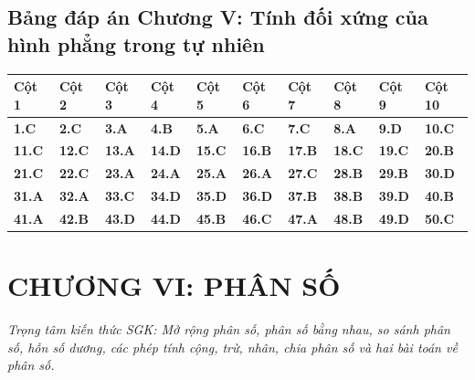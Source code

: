 \documentclass[11pt,a4paper]{article}
\begin{document}
\subsection*{\color{primary} Bảng đáp án Chương V: Tính đối xứng của hình phẳng trong tự nhiên}
\begin{center}
\renewcommand{\arraystretch}{1.25}
\begin{tabularx}{\textwidth}{*{10}{>{\centering\arraybackslash}X}}
\toprule
\textbf{\color{primary} Cột 1} & \textbf{\color{primary} Cột 2} & \textbf{\color{primary} Cột 3} & \textbf{\color{primary} Cột 4} & \textbf{\color{primary} Cột 5} & \textbf{\color{primary} Cột 6} & \textbf{\color{primary} Cột 7} & \textbf{\color{primary} Cột 8} & \textbf{\color{primary} Cột 9} & \textbf{\color{primary} Cột 10} \\
\midrule
\textbf{1.C} & \textbf{2.C} & \textbf{3.A} & \textbf{4.B} & \textbf{5.A} & \textbf{6.C} & \textbf{7.C} & \textbf{8.A} & \textbf{9.D} & \textbf{10.C} \\
\rowcolor{rowtint} \textbf{11.C} & \textbf{12.C} & \textbf{13.A} & \textbf{14.D} & \textbf{15.C} & \textbf{16.B} & \textbf{17.B} & \textbf{18.C} & \textbf{19.C} & \textbf{20.B} \\
\textbf{21.C} & \textbf{22.C} & \textbf{23.A} & \textbf{24.A} & \textbf{25.A} & \textbf{26.A} & \textbf{27.C} & \textbf{28.B} & \textbf{29.B} & \textbf{30.D} \\
\rowcolor{rowtint} \textbf{31.A} & \textbf{32.A} & \textbf{33.C} & \textbf{34.D} & \textbf{35.D} & \textbf{36.D} & \textbf{37.B} & \textbf{38.B} & \textbf{39.D} & \textbf{40.B} \\
\textbf{41.A} & \textbf{42.B} & \textbf{43.D} & \textbf{44.D} & \textbf{45.B} & \textbf{46.C} & \textbf{47.A} & \textbf{48.B} & \textbf{49.D} & \textbf{50.C} \\
\bottomrule
\end{tabularx}
\end{center}\vspace{10pt}
\section*{\color{primary} CHƯƠNG VI: PHÂN SỐ}
\textit{Trọng tâm kiến thức SGK: Mở rộng phân số, phân số bằng nhau, so sánh phân số, hỗn số dương, các phép tính cộng, trừ, nhân, chia phân số và hai bài toán về phân số.}\par\vspace{4pt}
\end{document}
